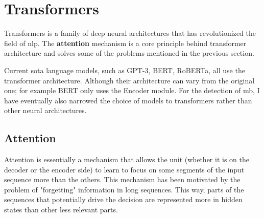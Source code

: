 \section{Transformers}\label{att_transformers}
Transformers is a family of deep neural architectures that has revolutionized the field of \gls{nlp}. The \textbf{attention} mechanism is a core principle behind transformer architecture and solves some of the problems mentioned in the previous section.

Current \gls{sota} language models, such as GPT-3, BERT, RoBERTa, all use the transformer architecture. Although their architecture can vary from the original one; for example BERT only uses the Encoder module. For the detection of \gls{mb}, I have eventually also narrowed the choice of models to transformers rather than other neural architectures.



\subsection{Attention}
Attention \cite{bahdanau2014neural,luongeffective} is essentially a mechanism that allows the unit (whether it is on the decoder or the encoder side) to learn to focus on some segments of the input sequence more than the others. This mechanism has been motivated by the problem of "forgetting" information in long sequences. This way, parts of the sequences that potentially drive the decision are represented more in hidden states than other less relevant parts.

